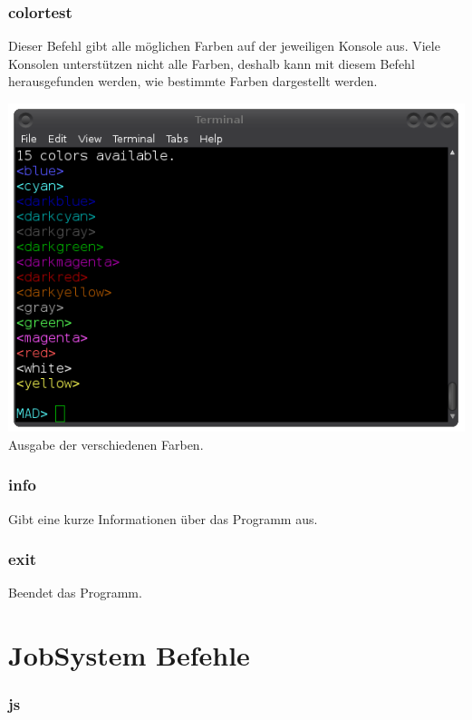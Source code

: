 \documentclass[12pt,a4paper]{report}
\begin{document}
\subsubsection{colortest}

Dieser Befehl gibt alle möglichen Farben auf der jeweiligen Konsole aus. Viele Konsolen unterstützen nicht alle Farben, deshalb kann mit diesem Befehl herausgefunden werden, wie bestimmte Farben dargestellt werden.

\begin{center}
\includegraphics[scale=0.5]{img/cli_colortest.png}\\
Ausgabe der verschiedenen Farben.
\end{center}

\subsubsection{info}

Gibt eine kurze Informationen über das Programm aus.

\subsubsection{exit}

Beendet das Programm.

\section{JobSystem Befehle}

\subsubsection{js}
\end{document}
